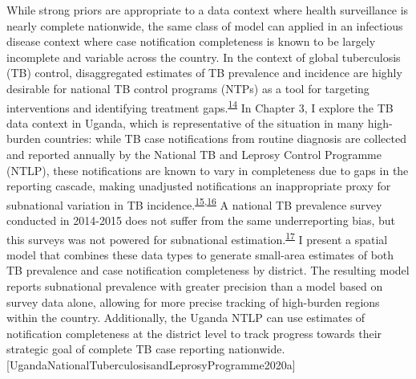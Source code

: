 \documentclass[
]{article}
\begin{document}
While strong priors are appropriate to a data context where health surveillance is nearly complete nationwide, the same class of model can applied in an infectious disease context where case notification completeness is known to be largely incomplete and variable across the country. In the context of global tuberculosis (TB) control, disaggregated estimates of TB prevalence and incidence are highly desirable for national TB control programs (NTPs) as a tool for targeting interventions and identifying treatment gaps.\textsuperscript{\protect\hyperlink{ref-Glaziou2018a}{14}} In Chapter 3, I explore the TB data context in Uganda, which is representative of the situation in many high-burden countries: while TB case notifications from routine diagnosis are collected and reported annually by the National TB and Leprosy Control Programme (NTLP), these notifications are known to vary in completeness due to gaps in the reporting cascade, making unadjusted notifications an inappropriate proxy for subnational variation in TB incidence.\textsuperscript{\protect\hyperlink{ref-Rood2019}{15},\protect\hyperlink{ref-Shaweno2018}{16}} A national TB prevalence survey conducted in 2014-2015 does not suffer from the same underreporting bias, but this surveys was not powered for subnational estimation.\textsuperscript{\protect\hyperlink{ref-UgandaMinistryofHealth2015}{17}} I present a spatial model that combines these data types to generate small-area estimates of both TB prevalence and case notification completeness by district. The resulting model reports subnational prevalence with greater precision than a model based on survey data alone, allowing for more precise tracking of high-burden regions within the country. Additionally, the Uganda NTLP can use estimates of notification completeness at the district level to track progress towards their strategic goal of complete TB case reporting nationwide.{[}UgandaNationalTuberculosisandLeprosyProgramme2020a{]}
\end{document}
